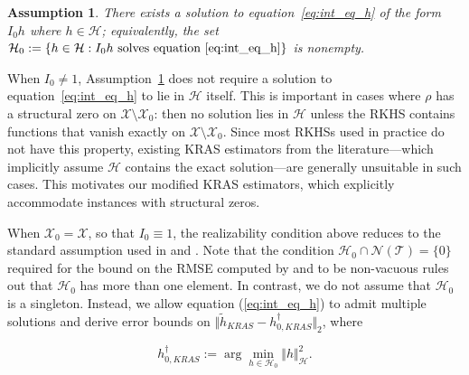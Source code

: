 \documentclass[twoside,11pt]{article}
\newtheorem{assumption}{Assumption}
\newcommand{\mc}{\mathcal}
\begin{document}
\begin{assumption}
There exists a solution to equation~\eqref{eq:int_eq_h} of the form $I_0 h$ where $h \in \mathcal{H}$; equivalently, the set
$\mathcal{H}_0 := \{h \in \mathcal{H} : I_0 h \ \text{solves equation~\eqref{eq:int_eq_h}} \}$ 
is nonempty.
\label{ass:relizability}
\end{assumption}

When $I_0 \neq 1$, Assumption~\ref{ass:relizability} does not require a solution to equation~\eqref{eq:int_eq_h} to lie in $\mathcal{H}$ itself. This is important in cases where $\rho$ has a structural zero on $\mathcal{X} \setminus \mathcal{X}_0$: then no solution lies in $\mathcal{H}$ unless the RKHS contains functions that vanish exactly on $\mathcal{X} \setminus \mathcal{X}_0$. Since most RKHSs used in practice do not have this property, existing KRAS estimators from the literature---which implicitly assume $\mathcal{H}$ contains the exact solution---are generally unsuitable in such cases. This motivates our modified KRAS estimators, which explicitly accommodate instances with structural zeros.

When $\mathcal{X}_0 = \mathcal{X}$, so that $I_0 \equiv 1$, the realizability condition above reduces to the standard assumption used in \citet{dikkala2020minimax} and \citet{ghassami2022minimax}. Note that the condition $\mc{H}_0\cap\mc{N}(\mc{T})=\{0\}$ required for the bound on the RMSE computed by \cite{dikkala2020minimax} and \cite{ghassami2022minimax} to be non-vacuous rules out that $\mc{H}_0$ has more than one element. In contrast, we do not assume that $\mathcal{H}_0$ is a singleton. Instead, we allow equation (\ref{eq:int_eq_h}) to admit multiple solutions and derive error bounds on $\Vert \tilde{h}_{KRAS} - h_{0,KRAS}^\dagger \Vert_2$, where

\begin{equation}
h_{0,KRAS}^\dagger := \arg \min_{h \in \mathcal{H}_0} \Vert h \Vert_{\mathcal{H}}^2.
\label{def:h_0_dag}
\end{equation}
\end{document}
